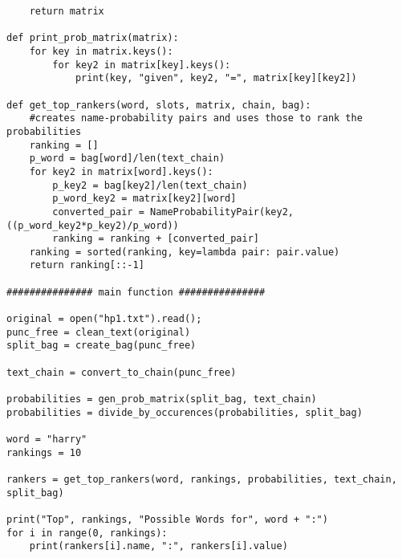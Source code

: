 \documentclass[onecolumn]{./IEEE/IEEEtran}
\begin{document}
\begin{lstlisting}
    return matrix

def print_prob_matrix(matrix):
    for key in matrix.keys():
        for key2 in matrix[key].keys():
            print(key, "given", key2, "=", matrix[key][key2])

def get_top_rankers(word, slots, matrix, chain, bag):
    #creates name-probability pairs and uses those to rank the probabilities
    ranking = []
    p_word = bag[word]/len(text_chain)
    for key2 in matrix[word].keys():
        p_key2 = bag[key2]/len(text_chain)
        p_word_key2 = matrix[key2][word]
        converted_pair = NameProbabilityPair(key2, ((p_word_key2*p_key2)/p_word))
        ranking = ranking + [converted_pair]
    ranking = sorted(ranking, key=lambda pair: pair.value)
    return ranking[::-1]

############### main function ###############

original = open("hp1.txt").read();
punc_free = clean_text(original)
split_bag = create_bag(punc_free)

text_chain = convert_to_chain(punc_free)

probabilities = gen_prob_matrix(split_bag, text_chain)
probabilities = divide_by_occurences(probabilities, split_bag)

word = "harry"
rankings = 10

rankers = get_top_rankers(word, rankings, probabilities, text_chain, split_bag)

print("Top", rankings, "Possible Words for", word + ":")
for i in range(0, rankings):
    print(rankers[i].name, ":", rankers[i].value)

\end{lstlisting}
\end{document}
